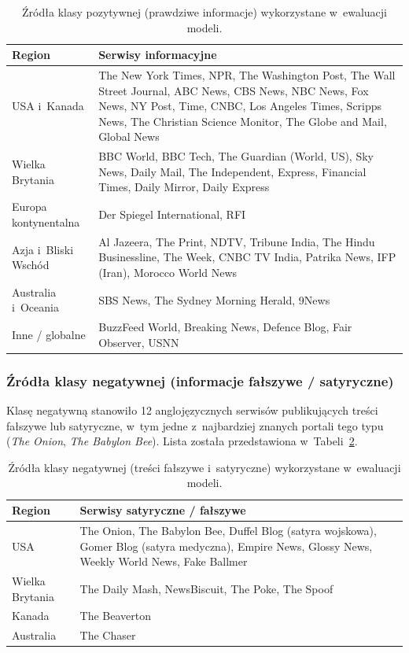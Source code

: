 \documentclass[oneside,polski,logo]{amuthesis}
\begin{document}
\begin{table}[ht]
\centering
\caption{Źródła klasy pozytywnej (prawdziwe informacje)
wykorzystane w~ewaluacji modeli.}
\label{tab:zrodla_prawda}
\begin{tabular}{p{3.2cm}p{10.5cm}}
\toprule
Region & Serwisy informacyjne \\
\midrule
USA i~Kanada & The New York Times, NPR, The Washington Post,
The Wall Street Journal, ABC News, CBS News, NBC News, Fox News,
NY Post, Time, CNBC, Los Angeles Times, Scripps News,
The Christian Science Monitor, The Globe and Mail, Global News \\
\midrule
Wielka Brytania & BBC World, BBC Tech, The Guardian (World, US),
Sky News, Daily Mail, The Independent, Express, Financial Times,
Daily Mirror, Daily Express \\
\midrule
Europa kontynentalna & Der Spiegel International, RFI \\
\midrule
Azja i~Bliski Wschód & Al Jazeera, The Print, NDTV, Tribune India,
The Hindu Businessline, The Week, CNBC TV India, Patrika News,
IFP (Iran), Morocco World News \\
\midrule
Australia i~Oceania & SBS News, The Sydney Morning Herald, 9News \\
\midrule
Inne / globalne & BuzzFeed World, Breaking News, Defence Blog,
Fair Observer, USNN \\
\bottomrule
\end{tabular}
\end{table}

\subsubsection*{Źródła klasy negatywnej (informacje fałszywe /
satyryczne)}

Klasę negatywną stanowiło 12 anglojęzycznych serwisów publikujących
treści fałszywe lub satyryczne, w~tym jedne z~najbardziej znanych
portali tego typu (\textit{The Onion}, \textit{The Babylon Bee}).
Lista została przedstawiona w~Tabeli~\ref{tab:zrodla_falsz}.

\begin{table}[ht]
\centering
\caption{Źródła klasy negatywnej (treści fałszywe i~satyryczne)
wykorzystane w~ewaluacji modeli.}
\label{tab:zrodla_falsz}
\begin{tabular}{p{3.2cm}p{10.5cm}}
\toprule
Region & Serwisy satyryczne / fałszywe \\
\midrule
USA & The Onion, The Babylon Bee, Duffel Blog (satyra wojskowa),
Gomer Blog (satyra medyczna), Empire News, Glossy News,
Weekly World News, Fake Ballmer \\
\midrule
Wielka Brytania & The Daily Mash, NewsBiscuit, The Poke, The Spoof \\
\midrule
Kanada & The Beaverton \\
\midrule
Australia & The Chaser \\
\bottomrule
\end{tabular}
\end{table}
\end{document}
